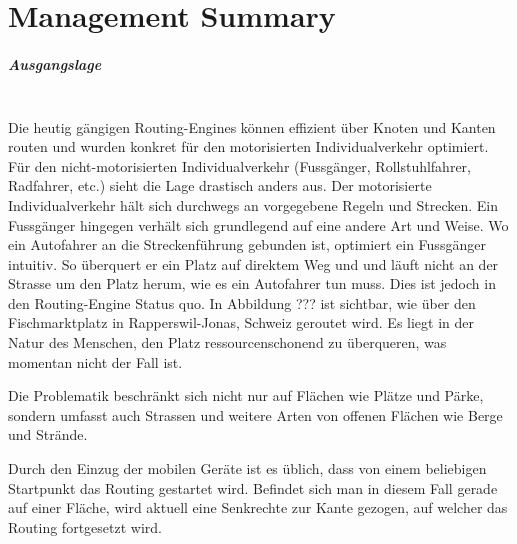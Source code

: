 
\chapter*{Management Summary}



\paragraph{Ausgangslage}~\\
Die heutig gängigen Routing-Engines können effizient über Knoten und Kanten routen und wurden konkret für den motorisierten Individualverkehr optimiert. Für den nicht-motorisierten Individualverkehr (Fussgänger, Rollstuhlfahrer, Radfahrer, etc.) sieht die Lage drastisch anders aus. Der motorisierte Individualverkehr hält sich durchwegs an vorgegebene Regeln und Strecken. Ein Fussgänger hingegen verhält sich grundlegend auf eine andere Art und Weise. Wo ein Autofahrer an die Streckenführung gebunden ist, optimiert ein Fussgänger intuitiv. So überquert er ein Platz auf direktem Weg und und läuft nicht an der Strasse um den Platz herum, wie es ein Autofahrer tun muss. Dies ist jedoch in den Routing-Engine Status quo. In Abbildung ??? ist sichtbar, wie über den Fischmarktplatz in Rapperswil-Jonas, Schweiz geroutet wird. Es liegt in der Natur des Menschen, den Platz ressourcenschonend zu überqueren, was momentan nicht der Fall ist.

Die Problematik beschränkt sich nicht nur auf Flächen wie Plätze und Pärke, sondern umfasst auch Strassen und weitere Arten von offenen Flächen wie Berge und Strände.

Durch den Einzug der mobilen Geräte ist es üblich, dass von einem beliebigen Startpunkt das Routing gestartet wird. Befindet sich man in diesem Fall gerade auf einer Fläche, wird aktuell eine Senkrechte zur Kante gezogen, auf welcher das Routing fortgesetzt wird.


